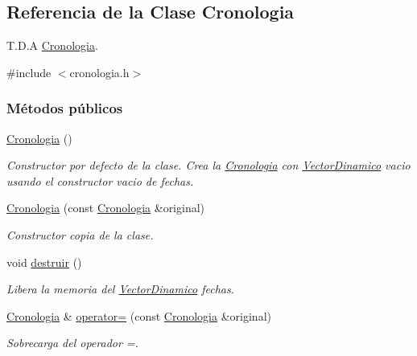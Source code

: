 \hypertarget{classCronologia}{}\subsection{Referencia de la Clase Cronologia}
\label{classCronologia}


T.\+D.\+A \hyperlink{classCronologia}{Cronologia}.  




{\ttfamily \#include $<$cronologia.\+h$>$}

\subsubsection*{Métodos públicos}
\begin{DoxyCompactItemize}
\item 
\mbox{\label{classCronologia_ac0026b1919148f6cd6cf4ca4c357771e}} 
\hyperlink{classCronologia_ac0026b1919148f6cd6cf4ca4c357771e}{Cronologia} ()
\begin{DoxyCompactList}\small\item\em Constructor por defecto de la clase. Crea la {\ttfamily \hyperlink{classCronologia}{Cronologia}} con {\ttfamily \hyperlink{classVectorDinamico}{Vector\+Dinamico}} vacio usando el constructor vacio de fechas. \end{DoxyCompactList}\item 
\hyperlink{classCronologia_a4de4592918375f3053acee2317dcc711}{Cronologia} (const \hyperlink{classCronologia}{Cronologia} \&original)
\begin{DoxyCompactList}\small\item\em Constructor copia de la clase. \end{DoxyCompactList}\item 
\mbox{\label{classCronologia_a8a1bfaf50b128869c7be0d6041a84cbd}} 
void \hyperlink{classCronologia_a8a1bfaf50b128869c7be0d6041a84cbd}{destruir} ()
\begin{DoxyCompactList}\small\item\em Libera la memoria del {\ttfamily \hyperlink{classVectorDinamico}{Vector\+Dinamico}} fechas. \end{DoxyCompactList}\item 
\hyperlink{classCronologia}{Cronologia} \& \hyperlink{classCronologia_a28519d10143c6587318536bebab56137}{operator=} (const \hyperlink{classCronologia}{Cronologia} \&original)
\begin{DoxyCompactList}\small\item\em Sobrecarga del operador =. \end{DoxyCompactList}\item 

\end{DoxyCompactItemize}

